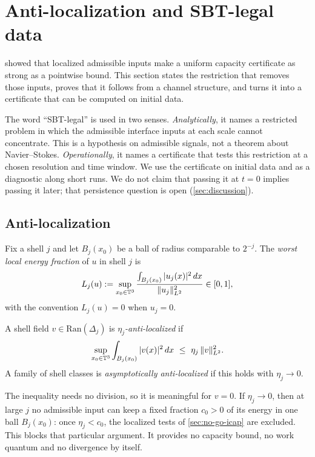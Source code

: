 \section{Anti-localization and SBT-legal data}
\label{sec:spt-legal}

 showed that localized admissible inputs make a uniform capacity certificate
as strong as a pointwise bound. This section states the restriction that removes those inputs,
proves that it follows from a channel structure, and turns it into a certificate that can be
computed on initial data.

The word ``SBT-legal'' is used in two senses. \emph{Analytically}, it names a restricted problem in
which the admissible interface inputs at each scale cannot concentrate. This is a hypothesis on
admissible signals, not a theorem about Navier--Stokes. \emph{Operationally}, it names a certificate
that tests this restriction at a chosen resolution and time window. We use the certificate on
initial data and as a diagnostic along short runs. We do not claim that passing it at $t=0$ implies
passing it later; that persistence question is open (\cref{sec:discussion}).

\subsection{Anti-localization}

Fix a shell $j$ and let $B_j(x_0)$ be a ball of radius comparable to $2^{-j}$. The \emph{worst local
energy fraction} of $u$ in shell $j$ is
\begin{equation}\label{eq:local-energy-fraction}
L_j(u):=\sup_{x_0\in\mathbb{T}^3}\frac{\int_{B_j(x_0)}|u_j(x)|^2\,dx}{\|u_j\|_{L^2}^2}\in[0,1],
\end{equation}
with the convention $L_j(u)=0$ when $u_j=0$.

\begin{definition}\label{def:anti-localization}
A shell field $v\in\mathrm{Ran}(\Delta_j)$ is \emph{$\eta_j$-anti-localized} if
\begin{equation}\label{eq:antiloc}
\sup_{x_0\in\mathbb{T}^3}\int_{B_j(x_0)}|v(x)|^2\,dx\ \le\ \eta_j\,\|v\|_{L^2}^2 .
\end{equation}
A family of shell classes is \emph{asymptotically anti-localized} if this holds with $\eta_j\to0$.
\end{definition}

The inequality needs no division, so it is meaningful for $v=0$. If $\eta_j\to0$, then at large $j$
no admissible input can keep a fixed fraction $c_0>0$ of its energy in one ball $B_j(x_0)$: once
$\eta_j<c_0$, the localized tests of \cref{sec:no-go-icap} are excluded. This blocks that
particular argument. It provides no capacity bound, no work quantum and no divergence by itself.

